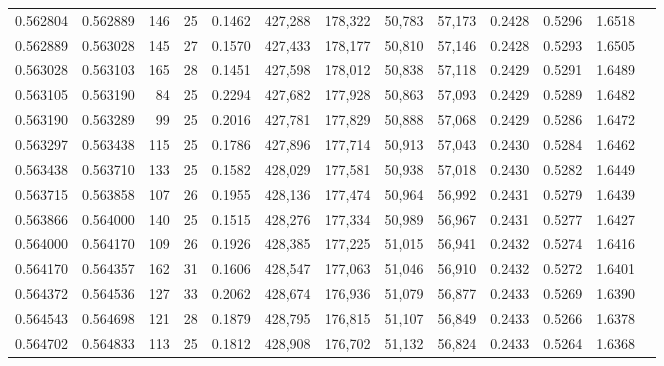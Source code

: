 \begin{tabular}{rrrrrrrrrrrrr}
0.562804 & 0.562889 &   146 &  25 &                                     0.1462 & 427,288 & 178,322 &  50,783 &  57,173 & 0.2428 & 0.5296 & 1.6518 \\
0.562889 & 0.563028 &   145 &  27 &                                     0.1570 & 427,433 & 178,177 &  50,810 &  57,146 & 0.2428 & 0.5293 & 1.6505 \\
0.563028 & 0.563103 &   165 &  28 &                                     0.1451 & 427,598 & 178,012 &  50,838 &  57,118 & 0.2429 & 0.5291 & 1.6489 \\
0.563105 & 0.563190 &    84 &  25 &                                     0.2294 & 427,682 & 177,928 &  50,863 &  57,093 & 0.2429 & 0.5289 & 1.6482 \\
0.563190 & 0.563289 &    99 &  25 &                                     0.2016 & 427,781 & 177,829 &  50,888 &  57,068 & 0.2429 & 0.5286 & 1.6472 \\
0.563297 & 0.563438 &   115 &  25 &                                     0.1786 & 427,896 & 177,714 &  50,913 &  57,043 & 0.2430 & 0.5284 & 1.6462 \\
0.563438 & 0.563710 &   133 &  25 &                                     0.1582 & 428,029 & 177,581 &  50,938 &  57,018 & 0.2430 & 0.5282 & 1.6449 \\
0.563715 & 0.563858 &   107 &  26 &                                     0.1955 & 428,136 & 177,474 &  50,964 &  56,992 & 0.2431 & 0.5279 & 1.6439 \\
0.563866 & 0.564000 &   140 &  25 &                                     0.1515 & 428,276 & 177,334 &  50,989 &  56,967 & 0.2431 & 0.5277 & 1.6427 \\
0.564000 & 0.564170 &   109 &  26 &                                     0.1926 & 428,385 & 177,225 &  51,015 &  56,941 & 0.2432 & 0.5274 & 1.6416 \\
0.564170 & 0.564357 &   162 &  31 &                                     0.1606 & 428,547 & 177,063 &  51,046 &  56,910 & 0.2432 & 0.5272 & 1.6401 \\
0.564372 & 0.564536 &   127 &  33 &                                     0.2062 & 428,674 & 176,936 &  51,079 &  56,877 & 0.2433 & 0.5269 & 1.6390 \\
0.564543 & 0.564698 &   121 &  28 &                                     0.1879 & 428,795 & 176,815 &  51,107 &  56,849 & 0.2433 & 0.5266 & 1.6378 \\
0.564702 & 0.564833 &   113 &  25 &                                     0.1812 & 428,908 & 176,702 &  51,132 &  56,824 & 0.2433 & 0.5264 & 1.6368 \\

\end{tabular}
